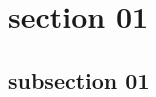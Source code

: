 \documentclass[class=book, crop=false]{standalone}
\begin{document}
\section{section 01}

\subsection{subsection 01}

\paragraph*{}
\blindmathpaper

\cite{latex2e}
\end{document}
